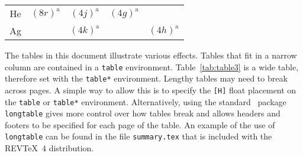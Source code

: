 \documentclass[%
 aip,
 jmp,%
 amsmath,amssymb,
preprint,%
 reprint,%
]{revtex4-2}
\begin{document}
\begin{table*}
\begin{ruledtabular}
\begin{tabular}{ccccc}
      He  & $(8r)^{\text{a}}$                                                            & $(4j)^{\text{a}}$                                                      & $(4g)^{\text{a}}$                     \\
      Ag  &                                                                              & $(4k)^{\text{a}}$                                                      &                   & $(4h)^{\text{a}}$ \\
    \end{tabular}
  \end{ruledtabular}
\end{table*}

The tables in this document illustrate various effects.
Tables that fit in a narrow column are contained in a \texttt{table}
environment.
Table~\ref{tab:table3} is a wide table, therefore set with the
\texttt{table*} environment.
Lengthy tables may need to break across pages.
A simple way to allow this is to specify
the \verb+[H]+ float placement on the \texttt{table} or
\texttt{table*} environment.
Alternatively, using the standard \LaTeXe\ package \texttt{longtable}
gives more control over how tables break and allows headers and footers
to be specified for each page of the table.
An example of the use of \texttt{longtable} can be found
in the file \texttt{summary.tex} that is included with the REV\TeX~4
distribution.
\end{document}
